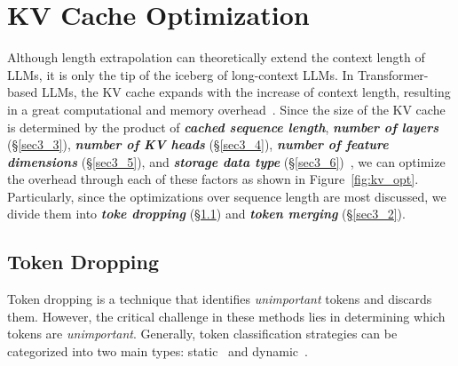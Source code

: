 \section{KV Cache Optimization}\label{sec3}

Although length extrapolation can theoretically extend the context length of LLMs, it is only the tip of the iceberg of long-context LLMs. In Transformer-based LLMs, the KV cache expands with the increase of context length, resulting in a great computational and memory overhead~\citep{fu2024challenges,luohekeep,xiaoefficient}. Since the size of the KV cache is determined by the product of \textbf{\textit{cached sequence length}}, \textbf{\textit{number of layers}} (\S\ref{sec3_3}), \textbf{\textit{number of KV heads}} (\S\ref{sec3_4}), \textbf{\textit{number of feature dimensions}} (\S\ref{sec3_5}), and \textbf{\textit{storage data type}} (\S\ref{sec3_6})~\citep{fu2024challenges,Venkat2024EssentialMath}, we can optimize the overhead through each of these factors as shown in Figure~\ref{fig:kv_opt}. Particularly, since the optimizations over sequence length are most discussed, we divide them into \textbf{\textit{toke dropping}}  (\S\ref{sec3_1}) and \textbf{\textit{token merging}}  (\S\ref{sec3_2}).



\subsection{Token Dropping}\label{sec3_1}



Token dropping is a technique that identifies \textit{unimportant} tokens and discards them. However, the critical challenge in these methods lies in determining which tokens are \textit{unimportant}. Generally, token classification strategies can be categorized into two main types: static~\citep{xiaoefficient, han2024lm} and dynamic~\citep{zhang2023h2o, li2024snapkv}.

